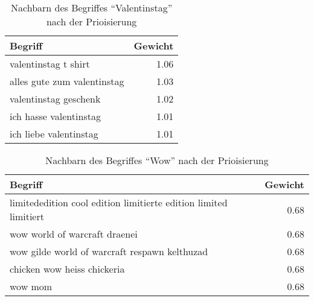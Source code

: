 \begin{table}[ht]
\centering
\begin{tabular*}{0.9\textwidth}{@{\extracolsep{\fill} } lr}
    \toprule
    Begriff & Gewicht \\
    \midrule
    valentinstag t shirt & \num{1.06} \\
    alles gute zum valentinstag & \num{1.03} \\
    valentinstag geschenk & \num{1.02} \\
    ich hasse valentinstag & \num{1.01} \\
    ich liebe valentinstag & \num{1.01} \\
    \bottomrule
\end{tabular*}
\caption{Nachbarn des Begriffes ``Valentinstag'' nach der Prioisierung}
\label{tab:prio_res_valentinstag}
\end{table}

\begin{table}[ht]
\centering
\begin{tabular*}{0.9\textwidth}{@{\extracolsep{\fill} } lr}
    \toprule
    Begriff & Gewicht \\
    \midrule
    limitededition cool edition limitierte edition limited limitiert & \num{0.68} \\
    wow world of warcraft draenei & \num{0.68} \\
    wow gilde world of warcraft respawn kelthuzad & \num{0.68} \\
    chicken wow heiss chickeria & \num{0.68} \\
    wow mom & \num{0.68} \\
    \bottomrule
\end{tabular*}
\caption{Nachbarn des Begriffes ``Wow'' nach der Prioisierung}
\label{tab:prio_res_wow}
\end{table}
